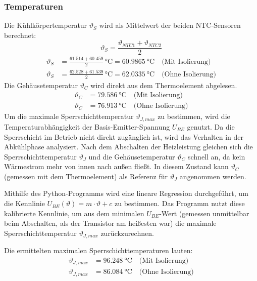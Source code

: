 \subsubsection{Temperaturen}
\label{scn:anal_temp}
Die Kühlkörpertemperatur $\vartheta_S$ wird als Mittelwert der beiden NTC-Sensoren berechnet:
\begin{equation}
    \vartheta_S = \frac{\vartheta_{NTC1} + \vartheta_{NTC2}}{2}
\end{equation}
\begin{align*}
        \vartheta_S &= \frac{61.514 + 60.459}{2} \, \si{\degreeCelsius} = \boxed{\SI{60.9865}{\degreeCelsius}} \quad \text{(Mit Isolierung)} \\
        \vartheta_S &= \frac{62.528 + 61.539}{2} \, \si{\degreeCelsius} = \boxed{\SI{62.0335}{\degreeCelsius}} \quad \text{(Ohne Isolierung)}
\end{align*}
Die Gehäusetemperatur $\vartheta_C$ wird direkt aus dem Thermoelement abgelesen.
\begin{align*}
        \vartheta_C & = \boxed{\SI{79.586}{\degreeCelsius}} \quad \text{(Mit Isolierung)} \\
        \vartheta_C & = \boxed{\SI{76.913}{\degreeCelsius}} \quad \text{(Ohne Isolierung)}
\end{align*}
Um die maximale Sperrschichttemperatur $\vartheta_{J,max}$ zu bestimmen, wird die Temperaturabhängigkeit der Basis-Emitter-Spannung $U_{BE}$ genutzt. Da die Sperrschicht im Betrieb nicht direkt zugänglich ist, wird das Verhalten in der Abkühlphase analysiert. Nach dem Abschalten der Heizleistung gleichen sich die Sperrschichttemperatur $\vartheta_J$ und die Gehäusetemperatur $\vartheta_C$ schnell an, da kein Wärmestrom mehr von innen nach außen fließt. In diesem Zustand kann $\vartheta_C$ (gemessen mit dem Thermoelement) als Referenz für $\vartheta_J$ angenommen werden.

Mithilfe des Python-Programms wird eine lineare Regression durchgeführt, um die Kennlinie $U_{BE}(\vartheta) = m \cdot \vartheta + c$ zu bestimmen. Das Programm nutzt diese kalibrierte Kennlinie, um aus dem minimalen $U_{BE}$-Wert (gemessen unmittelbar beim Abschalten, als der Transistor am heißesten war) die maximale Sperrschichttemperatur $\vartheta_{J,max}$ zurückzurechnen.

Die ermittelten maximalen Sperrschichttemperaturen lauten:
\begin{align*}
    \vartheta_{J,max} &= \boxed{\SI{96.248}{\degreeCelsius}} \quad \text{(Mit Isolierung)} \\
    \vartheta_{J,max} &= \boxed{\SI{86.084}{\degreeCelsius}} \quad \text{(Ohne Isolierung)}
\end{align*}


